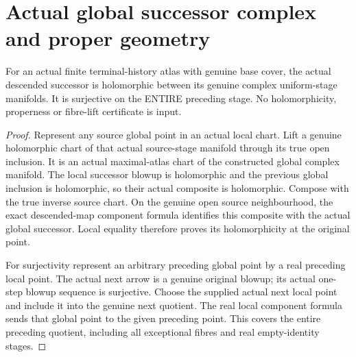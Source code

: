 \section{Actual global successor complex and proper geometry}

\begin{theorem}
\label{hir:sharp-actual-curve-global-successor-holo-surj}
\leanok
For an actual finite terminal-history atlas with genuine base cover, the
actual descended successor is holomorphic between its genuine complex
uniform-stage manifolds. It is surjective on the ENTIRE preceding stage.
No holomorphicity, properness or fibre-lift certificate is input.
\end{theorem}
\begin{proof}
Represent any source global point in an actual local chart. Lift a genuine
holomorphic chart of that actual source-stage manifold through its true
open inclusion. It is an actual maximal-atlas chart of the constructed
global complex manifold. The local successor blowup is holomorphic and
the previous global inclusion is holomorphic, so their actual composite
is holomorphic. Compose with the true inverse source chart. On the genuine
open source neighbourhood, the exact descended-map component formula
identifies this composite with the actual global successor. Local equality
therefore proves its holomorphicity at the original point.

For surjectivity represent an arbitrary preceding global point by a real
preceding local point. The actual next arrow is a genuine original blowup;
its actual one-step blowup sequence is surjective. Choose the supplied
actual next local point and include it into the genuine next quotient.
The real local component formula sends that global point to the given
preceding point. This covers the entire preceding quotient, including
all exceptional fibres and real empty-identity stages.
\end{proof}

